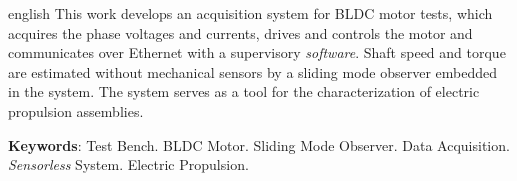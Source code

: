 
\begin{resumo}[Abstract]
 \begin{otherlanguage*}{english}
   This work develops an acquisition system for BLDC motor tests, which acquires the phase voltages and currents, drives and controls the motor and communicates over Ethernet with a supervisory \textit{software}. Shaft speed and torque are estimated without mechanical sensors by a sliding mode observer embedded in the system. The system serves as a tool for the characterization of electric propulsion assemblies.
   
   \textbf{Keywords}: Test Bench. BLDC Motor. Sliding Mode Observer. Data Acquisition. \textit{Sensorless} System. Electric Propulsion.
 \end{otherlanguage*}
\end{resumo}
